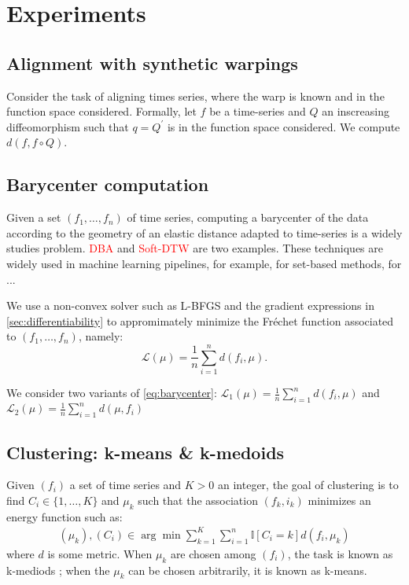 \section{Experiments}

\subsection{Alignment with synthetic warpings}

Consider the task of aligning times series, where the warp is known and in the function space considered. Formally, let $f$ be a time-series and $Q$ an inscreasing diffeomorphism such that $q = Q^\prime$ is in the function space considered. We compute $d(f, f\circ Q)$.

\subsection{Barycenter computation}
Given a set $(f_1, \ldots, f_n)$ of time series, computing a barycenter of the data according to the geometry of an elastic distance adapted to time-series is a widely studies problem. \textcolor{red}{DBA} and \textcolor{red}{Soft-DTW} are two examples. These techniques are widely used in machine learning pipelines, for example, for set-based methods, for ...

We use a non-convex solver such as L-BFGS and the gradient expressions in \cref{sec:differentiability} to appromimately minimize the Fréchet function associated to $(f_1, \ldots, f_n)$, namely:
\begin{equation}\label{eq:barycenter}
    \mathcal L(\mu) = \frac{1}{n}\sum_{i=1}^n d(f_i, \mu).
\end{equation}

We consider two variants of \cref{eq:barycenter}: $\mathcal L_1(\mu) = \frac{1}{n}\sum_{i=1}^n d(f_i,\mu)$ and $\mathcal L_2(\mu) = \frac{1}{n}\sum_{i=1}^n d(\mu, f_i)$



\subsection{Clustering: k-means \& k-medoids}

Given $(f_i)$ a set of time series and $K > 0$ an integer, the goal of clustering is to find $C_i \in \lbrace 1, \ldots, K\rbrace$ and $\mu_k$ such that the association $(f_k, i_k)$ minimizes an energy function such as:
\begin{align}
    (\mu_k), (C_i) \in \arg\min \sum_{k=1}^K\sum_{i=1}^n \mathbb I[C_i = k]d(f_i, \mu_k)
\end{align}
where $d$ is some metric. When $\mu_k$ are chosen among $(f_i)$, the task is known as k-mediods ; when the $\mu_k$ can be chosen arbitrarily, it is known as k-means.
